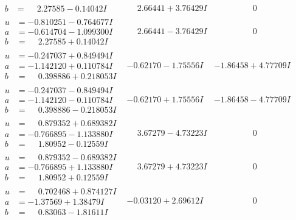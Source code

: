 \documentclass[1p]{elsarticle_modified}
\theoremstyle{definition}
\begin{document}
$$\begin{array}{c|c|c}
\begin{aligned}
b &= \phantom{-}2.27585 - 0.14042 I\end{aligned}
 & \phantom{-}2.66441 + 3.76429 I & \phantom{-0.000000 } 0 \\ \hline\begin{aligned}
u &= -0.810251 - 0.764677 I \\
a &= -0.614704 - 1.099300 I \\
b &= \phantom{-}2.27585 + 0.14042 I\end{aligned}
 & \phantom{-}2.66441 - 3.76429 I & \phantom{-0.000000 } 0 \\ \hline\begin{aligned}
u &= -0.247037 + 0.849494 I \\
a &= -1.142120 + 0.110784 I \\
b &= \phantom{-}0.398886 + 0.218053 I\end{aligned}
 & -0.62170 - 1.75556 I & -1.86458 + 4.77709 I \\ \hline\begin{aligned}
u &= -0.247037 - 0.849494 I \\
a &= -1.142120 - 0.110784 I \\
b &= \phantom{-}0.398886 - 0.218053 I\end{aligned}
 & -0.62170 + 1.75556 I & -1.86458 - 4.77709 I \\ \hline\begin{aligned}
u &= \phantom{-}0.879352 + 0.689382 I \\
a &= -0.766895 - 1.133880 I \\
b &= \phantom{-}1.80952 - 0.12559 I\end{aligned}
 & \phantom{-}3.67279 - 4.73223 I & \phantom{-0.000000 } 0 \\ \hline\begin{aligned}
u &= \phantom{-}0.879352 - 0.689382 I \\
a &= -0.766895 + 1.133880 I \\
b &= \phantom{-}1.80952 + 0.12559 I\end{aligned}
 & \phantom{-}3.67279 + 4.73223 I & \phantom{-0.000000 } 0 \\ \hline\begin{aligned}
u &= \phantom{-}0.702468 + 0.874127 I \\
a &= -1.37569 + 1.38479 I \\
b &= \phantom{-}0.83063 - 1.81611 I\end{aligned}
 & -0.03120 + 2.69612 I & \phantom{-0.000000 } 0 \\ \hline\begin{aligned}

\end{aligned}
\end{array}$$
\end{document}

